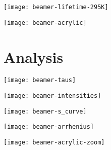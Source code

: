 \documentclass[english, fleqn]{beamer}
\begin{document}
\texttt{[image: beamer-lifetime-295K]}

\texttt{[image: beamer-acrylic]}

\section{Analysis}

\texttt{[image: beamer-taus]}

\texttt{[image: beamer-intensities]}

\texttt{[image: beamer-s\_curve]}

\texttt{[image: beamer-arrhenius]}

\begin{frame}
    \texttt{[image: beamer-acrylic-zoom]}
\end{frame}


\end{document}
